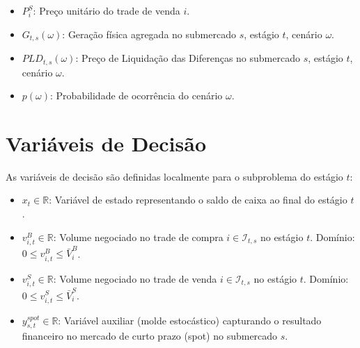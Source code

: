 \documentclass{article}
\begin{document}
\begin{itemize}
    \item $P^{S}_{i}$: Preço unitário do trade de venda $i$.
    
    \item $G_{t,s}(\omega)$: Geração física agregada no submercado $s$, estágio $t$, cenário $\omega$.
    
    \item $PLD_{t,s}(\omega)$: Preço de Liquidação das Diferenças no submercado $s$, estágio $t$, cenário $\omega$.
    
    \item $p(\omega)$: Probabilidade de ocorrência do cenário $\omega$.
\end{itemize}

\section{Variáveis de Decisão}
As variáveis de decisão são definidas localmente para o subproblema do estágio $t$:
\begin{itemize}
    \item $x_t \in \mathbb{R}$: Variável de estado representando o saldo de caixa ao final do estágio $t$.
    
    \item $v^{B}_{i,t} \in \mathbb{R}$: Volume negociado no trade de compra $i \in \mathcal{I}_{t,s}$ no estágio $t$. Domínio: $0 \leq v^{B}_{i,t} \leq \bar{V}^{B}_{i}$.
    
    \item $v^{S}_{i,t} \in \mathbb{R}$: Volume negociado no trade de venda $i \in \mathcal{I}_{t,s}$ no estágio $t$. Domínio: $0 \leq v^{S}_{i,t} \leq \bar{V}^{S}_{i}$.
    
    \item $y^{spot}_{s,t} \in \mathbb{R}$: Variável auxiliar (molde estocástico) capturando o resultado financeiro no mercado de curto prazo (spot) no submercado $s$.
\end{itemize}
\end{document}
